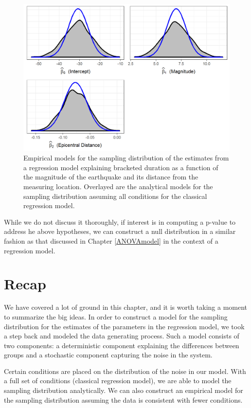\documentclass[]{book}
\theoremstyle{definition}
\theoremstyle{definition}
\theoremstyle{definition}
\theoremstyle{remark}
\begin{document}
\begin{figure}

{\centering \includegraphics[width=0.8\linewidth]{./Images/regconditions-mlr-bootstrap-plot-1} 

}

\caption{Empirical models for the sampling distribution of the estimates from a regression model explaining bracketed duration as a function of the magnitude of the earthquake and its distance from the measuring location.  Overlayed are the analytical models for the sampling distribution assuming all conditions for the classical regression model.}\label{fig:regconditions-mlr-bootstrap-plot}
\end{figure}

While we do not discuss it thoroughly, if interest is in computing a
p-value to address he above hypotheses, we can construct a null
distribution in a similar fashion as that discussed in Chapter
\ref{ANOVAmodel} in the context of a regression model.

\section{Recap}\label{recap-3}

We have covered a lot of ground in this chapter, and it is worth taking
a moment to summarize the big ideas. In order to construct a model for
the sampling distribution for the estimates of the parameters in the
regression model, we took a step back and modeled the data generating
process. Such a model consists of two components: a deterministic
component explaining the differences between groups and a stochastic
component capturing the noise in the system.

Certain conditions are placed on the distribution of the noise in our
model. With a full set of conditions (classical regression model), we
are able to model the sampling distribution analytically. We can also
construct an empirical model for the sampling distribution assuming the
data is consistent with fewer conditions.
\end{document}
